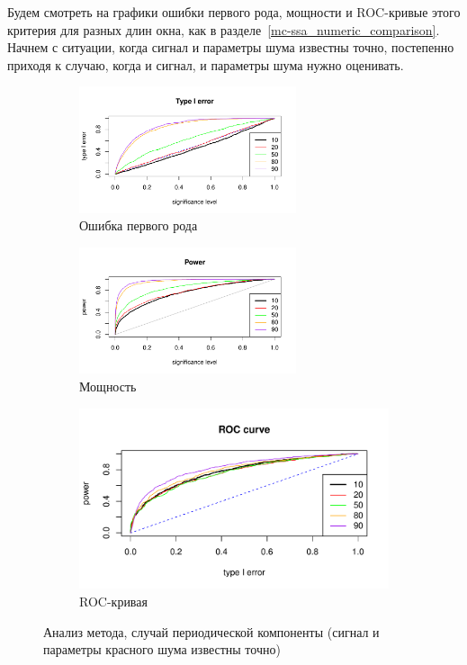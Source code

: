 \documentclass[specialist,
substylefile = spbu_report.rtx,
subf,href,colorlinks=true, 12pt]{disser}
\theoremstyle{definition}
\begin{document}
Будем смотреть на графики ошибки первого рода, мощности и ROC-кривые этого критерия для разных длин окна, как в разделе~\ref{mc-ssa_numeric_comparison}. Начнем с ситуации, когда сигнал и параметры шума известны точно, постепенно приходя к случаю, когда и сигнал, и параметры шума нужно оценивать.
\begin{figure}[h]
	\captionsetup[subfigure]{justification=Centering}
	\begin{subfigure}[t]{\textwidth}
		\centering
		\includegraphics[width=0.7\textwidth]{img/type1error_sin.pdf}
		\caption{Ошибка первого рода}
		\label{fig:sin_type1error}
	\end{subfigure}
	\begin{subfigure}[t]{\textwidth}
		\centering
		\includegraphics[width=0.7\textwidth]{img/power_sin.pdf}
		\caption{Мощность}
		\label{fig:sin_power}
	\end{subfigure}
	\begin{subfigure}[t]{\textwidth}
		\centering
		\includegraphics[width=0.7\linewidth]{img/roc_sin.pdf}
		\caption{ROC-кривая}
		\label{fig:sin_roc}
	\end{subfigure}
	\caption{Анализ метода, случай периодической компоненты (сигнал и параметры красного шума известны точно)}
	\label{fig:sin}
\end{figure}
\end{document}
